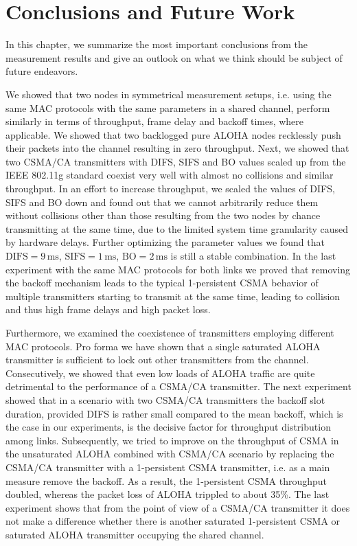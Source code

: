 \chapter{Conclusions and Future Work}
\label{ch:conclusions}

In this chapter, we summarize the most important conclusions from the measurement results and give an outlook on what we think should be subject of future endeavors.

We showed that two nodes in symmetrical measurement setups, i.e. using the same MAC protocols with the same parameters in a shared channel, perform similarly in terms of throughput, frame delay and backoff times, where applicable. We showed that two backlogged pure ALOHA nodes recklessly push their packets into the channel resulting in zero throughput. Next, we showed that two CSMA/CA transmitters with DIFS, SIFS and BO values scaled up from the IEEE 802.11g standard coexist very well with almost no collisions and similar throughput. In an effort to increase throughput, we scaled the values of DIFS, SIFS and BO down and found out that we cannot arbitrarily reduce them without collisions other than those resulting from the two nodes by chance transmitting at the same time, due to the limited system time granularity caused by hardware delays. Further optimizing the parameter values we found that $\text{DIFS}=9\,\text{ms}$, $\text{SIFS}=1\,\text{ms}$, $\text{BO}=2\,\text{ms}$ is still a stable combination. In the last experiment with the same MAC protocols for both links we proved that removing the backoff mechanism leads to the typical 1-persistent CSMA behavior of multiple transmitters starting to transmit at the same time, leading to collision and thus high frame delays and high packet loss.

Furthermore, we examined the coexistence of transmitters employing different MAC protocols. Pro forma we have shown that a single saturated ALOHA transmitter is sufficient to lock out other transmitters from the channel. Consecutively, we showed that even low loads of ALOHA traffic are quite detrimental to the performance of a CSMA/CA transmitter. The next experiment showed that in a scenario with two CSMA/CA transmitters the backoff slot duration, provided DIFS is rather small compared to the mean backoff, which is the case in our experiments, is the decisive factor for throughput distribution among links. Subsequently, we tried to improve on the throughput of CSMA in the unsaturated ALOHA combined with CSMA/CA scenario by replacing the CSMA/CA transmitter with a 1-persistent CSMA transmitter, i.e. as a main measure remove the backoff. As a result, the 1-persistent CSMA throughput doubled, whereas the packet loss of ALOHA trippled to about 35\%. The last experiment shows that from the point of view of a CSMA/CA transmitter it does not make a difference whether there is another saturated 1-persistent CSMA or saturated ALOHA transmitter occupying the shared channel.    

